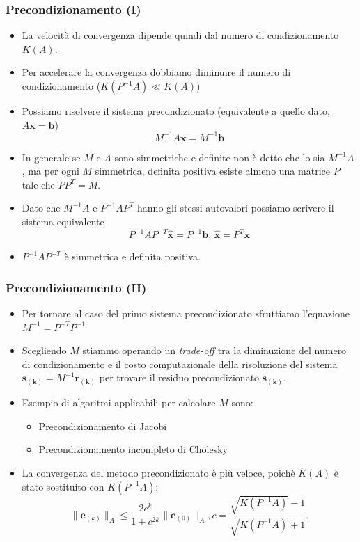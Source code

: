 \documentclass[10pt]{beamer}
\begin{document}
\begin{frame}
\frametitle{Precondizionamento (I)}
\begin{itemize}
    \item La velocità di convergenza dipende quindi dal numero di condizionamento $\mathit{K(A)}$. %
    
    \item Per accelerare la convergenza dobbiamo diminuire il numero di condizionamento ($K(P^{-1}A)\ll K(A)$)
    \item Possiamo risolvere il \alert{sistema precondizionato} (equivalente a quello dato, $A\mathbf{x}=\mathbf{b}$)
    $$
    M^{-1}A\mathbf{x}=M^{-1}\mathbf{b}
    $$
    \item In generale se $M$ e $A$ sono simmetriche e definite non è detto che lo sia $M^{-1}A$, ma per ogni $M$ simmetrica, definita positiva esiste almeno una matrice $P$ tale che $PP^T=M$.
    \item Dato che $M^{-1}A$ e $P^{-1}AP^T$ hanno gli stessi autovalori possiamo scrivere il sistema equivalente
    $$
    P^{-1}AP^{-T}\mathbf{\hat{x}}=P^{-1}\mathbf{b},\, \mathbf{\hat{x}}=P^T\mathbf{x}
    $$
    
    \item $P^{-1}AP^{-T}$ è simmetrica e definita positiva.
    
\end{itemize}    
\end{frame}


\begin{frame}
\frametitle{Precondizionamento (II)}
\begin{itemize}
    \item Per tornare al caso del primo sistema precondizionato sfruttiamo l'equazione $M^{-1}=P^{-T}P^{-1}$
    \item Scegliendo $M$ stiammo operando un \textit{trade-off} tra la diminuzione del numero di condizionamento e il costo computazionale della risoluzione del sistema $\mathbf{s_{(k)}}=M^{-1}\mathbf{r_{(k)}}$ per trovare il residuo precondizionato $\mathbf{s_{(k)}}$.
   
    \item Esempio di algoritmi applicabili per calcolare $M$ sono:
    \begin{itemize}
    \item Precondizionamento di Jacobi
    \item Precondizionamento incompleto di Cholesky
    \end{itemize}    
   
    \item  La convergenza del metodo precondizionato è più veloce, poichè $K(A)$ è stato sostituito con $K(P^{-1}A)$: 
    $$\|\mathbf{e}_{(k)}\|_A\leq\frac{2c^k}{1+c^{2k}}\|\mathbf{e}_{(0)}\|_A,  c=\frac{\sqrt{K(P^{-1}A)}-1}{\sqrt{K(P^{-1}A)}+1}.$$
\end{itemize}    
\end{frame}
\end{document}

